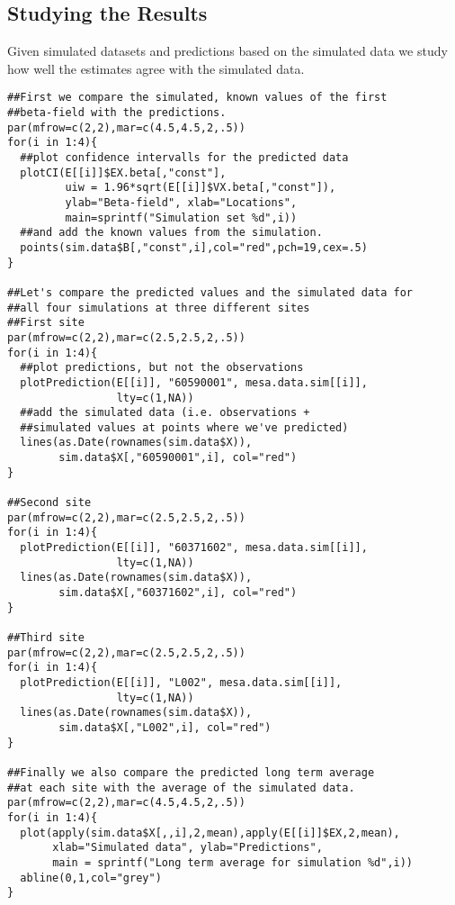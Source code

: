 \subsection{Studying the Results}
Given simulated datasets and predictions based on the simulated data
we study how well the estimates agree with the simulated data.
\vspace*{-0.5\baselineskip}
\begin{verbatim}
##First we compare the simulated, known values of the first 
##beta-field with the predictions.
par(mfrow=c(2,2),mar=c(4.5,4.5,2,.5))
for(i in 1:4){
  ##plot confidence intervalls for the predicted data
  plotCI(E[[i]]$EX.beta[,"const"], 
         uiw = 1.96*sqrt(E[[i]]$VX.beta[,"const"]),
         ylab="Beta-field", xlab="Locations",
         main=sprintf("Simulation set %d",i))
  ##and add the known values from the simulation.
  points(sim.data$B[,"const",i],col="red",pch=19,cex=.5)
}

##Let's compare the predicted values and the simulated data for 
##all four simulations at three different sites
##First site
par(mfrow=c(2,2),mar=c(2.5,2.5,2,.5))
for(i in 1:4){
  ##plot predictions, but not the observations
  plotPrediction(E[[i]], "60590001", mesa.data.sim[[i]], 
                 lty=c(1,NA))
  ##add the simulated data (i.e. observations + 
  ##simulated values at points where we've predicted)
  lines(as.Date(rownames(sim.data$X)), 
        sim.data$X[,"60590001",i], col="red")
}

##Second site
par(mfrow=c(2,2),mar=c(2.5,2.5,2,.5))
for(i in 1:4){
  plotPrediction(E[[i]], "60371602", mesa.data.sim[[i]], 
                 lty=c(1,NA))
  lines(as.Date(rownames(sim.data$X)), 
        sim.data$X[,"60371602",i], col="red")
}

##Third site
par(mfrow=c(2,2),mar=c(2.5,2.5,2,.5))
for(i in 1:4){
  plotPrediction(E[[i]], "L002", mesa.data.sim[[i]],
                 lty=c(1,NA))
  lines(as.Date(rownames(sim.data$X)), 
        sim.data$X[,"L002",i], col="red")
}

##Finally we also compare the predicted long term average
##at each site with the average of the simulated data.
par(mfrow=c(2,2),mar=c(4.5,4.5,2,.5))
for(i in 1:4){
  plot(apply(sim.data$X[,,i],2,mean),apply(E[[i]]$EX,2,mean),
       xlab="Simulated data", ylab="Predictions", 
       main = sprintf("Long term average for simulation %d",i))
  abline(0,1,col="grey")
}
\end{verbatim}

